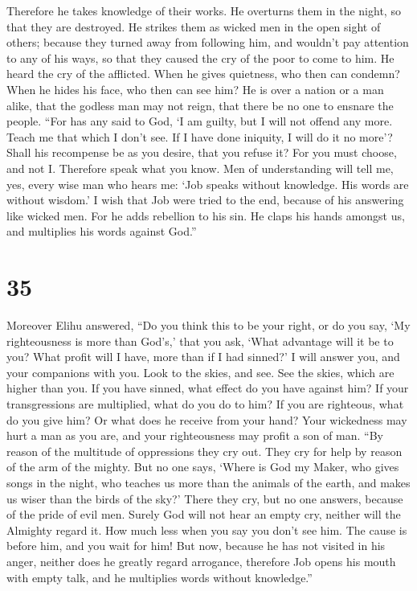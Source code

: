 Therefore he takes knowledge of their works. He overturns them in the
night, so that they are destroyed.  He strikes them as
wicked men in the open sight of others;  because they
turned away from following him, and wouldn't pay attention to any of his
ways,  so that they caused the cry of the poor to come to
him. He heard the cry of the afflicted.  When he gives
quietness, who then can condemn? When he hides his face, who then can
see him? He is over a nation or a man alike,  that the
godless man may not reign, that there be no one to ensnare the people.
 ``For has any said to God, `I am guilty, but I will not
offend any more.  Teach me that which I don't see. If I
have done iniquity, I will do it no more'?  Shall his
recompense be as you desire, that you refuse it? For you must choose,
and not I. Therefore speak what you know.  Men of
understanding will tell me, yes, every wise man who hears me:
 `Job speaks without knowledge. His words are without
wisdom.'  I wish that Job were tried to the end, because
of his answering like wicked men.  For he adds rebellion
to his sin. He claps his hands amongst us, and multiplies his words
against God.''

\hypertarget{section-34}{%
\section{35}\label{section-34}}

 Moreover Elihu answered,  ``Do you think
this to be your right, or do you say, `My righteousness is more than
God's,'  that you ask, `What advantage will it be to you?
What profit will I have, more than if I had sinned?'  I
will answer you, and your companions with you.  Look to
the skies, and see. See the skies, which are higher than you.
 If you have sinned, what effect do you have against him?
If your transgressions are multiplied, what do you do to him?
 If you are righteous, what do you give him? Or what does
he receive from your hand?  Your wickedness may hurt a man
as you are, and your righteousness may profit a son of man.
 ``By reason of the multitude of oppressions they cry out.
They cry for help by reason of the arm of the mighty. 
But no one says, `Where is God my Maker, who gives songs in the night,
 who teaches us more than the animals of the earth, and
makes us wiser than the birds of the sky?'  There they
cry, but no one answers, because of the pride of evil men.
 Surely God will not hear an empty cry, neither will the
Almighty regard it.  How much less when you say you don't
see him. The cause is before him, and you wait for him! 
But now, because he has not visited in his anger, neither does he
greatly regard arrogance,  therefore Job opens his mouth
with empty talk, and he multiplies words without knowledge.''

